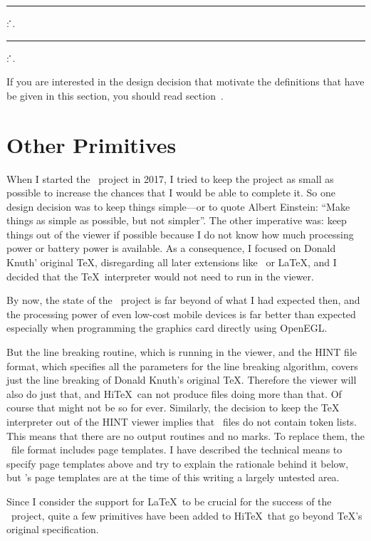 \medskip{}
\rule {}:
   \opt{\.{=}} \.{\LB}\.{\RB}.
\rule {}:
   \opt{\.{=}} \.{\LB}\.{\RB}.
\medskip

If you are interested in the design decision that motivate the definitions that have
be given in this section, you should read section~.

\section{Other Primitives}
When I started the \HINT\ project in 2017,
I tried to keep the project as small as possible to increase the
chances that I would be able to complete it. So one design decision
was to keep things simple---or to quote Albert Einstein: ``Make things 
as simple as possible, but not simpler''. The other imperative was:
keep things out of the viewer if possible because I do not know
how much processing power or battery power is available.
As a consequence, I focused on Donald Knuth' original \TeX,
disregarding all later extensions like \eTeX\ or \LaTeX, and I
decided that the \TeX\ interpreter would not need to run in the
viewer.

By now, the state of the \HINT\ project is far beyond of what
I had expected then, and the processing power of even low-cost
mobile devices is far better than expected especially when programming the
graphics card directly using OpenEGL.

But the line breaking routine, which is running in the viewer, and the
HINT file format, which specifies all the parameters for the
line breaking algorithm, covers just the line breaking of 
Donald Knuth's original \TeX. Therefore the viewer will
also do just that, and Hi\TeX\ can not produce files
doing more than that. Of course that might not be so
for ever.
Similarly, the decision to keep the TeX interpreter
out of the HINT viewer implies that \HINT\ files do
not contain token lists. This means that there are
no output routines and no marks.
To replace them, the \HINT\ file format includes
page templates. I have described the technical
means to specify page templates above and try to explain
the rationale behind it below, but \HINT's page templates 
are at the time of this writing a largely untested area.

Since I consider the support for \LaTeX\ to be crucial for
the success of the \HINT\ project, quite a few primitives
have been added to Hi\TeX\ that go beyond \TeX's original
specification. 

